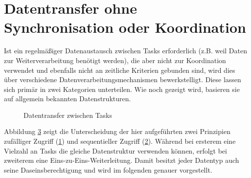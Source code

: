 \documentclass{llncs}
\begin{document}
\section{Datentransfer ohne Synchronisation oder Koordination}
\label{sub:Datentransfer_ohne_Sync_Koord}
Ist ein regelmäßiger Datenaustausch zwischen Tasks erforderlich (z.B. weil Daten zur Weiterverarbeitung benötigt werden), die aber nicht zur Koordination verwendet und ebenfalls nicht an zeitliche Kriterien gebunden sind, wird dies über verschiedene Datenverarbeitungsmechanismen bewerkstelligt. Diese lassen sich primär in zwei Kategorien unterteilen. Wie noch gezeigt wird, basieren sie auf allgemein bekannten Datenstrukturen.
\begin{figure}
	\centering
	\begin{subfigure}[b]{.450\textwidth}
		\def\svgwidth{\columnwidth}
		
		\caption{\label{subfig:zufaelliger_Zugriff}}
	\end{subfigure}
	\hspace{3em}
	\begin{subfigure}[b]{.450\textwidth}
		\def\svgwidth{\columnwidth}
		
		\caption{\label{subfig:sequentiell_Zugriff}}
	\end{subfigure}
	\caption{\label{fig:Datentransfer_Ueberblick}Datentransfer zwischen Tasks \autocite[vgl.][95]{Cooling2017}}
\end{figure}

Abbildung \ref{fig:Datentransfer_Ueberblick} zeigt die Unterscheidung der hier aufgeführten zwei Prinzipien \glqq zufälliger Zugriff\grqq{}  (\ref{subfig:zufaelliger_Zugriff}) und \glqq sequentieller Zugriff\grqq{} (\ref{subfig:sequentiell_Zugriff}). Während bei ersterem eine Vielzahl an Tasks die gleiche Datenstruktur verwenden können, erfolgt bei zweiterem eine Eins-zu-Eins-Weiterleitung. Damit besitzt jeder Datentyp auch seine Daseinsberechtigung und wird im folgenden genauer vorgestellt.
\end{document}
